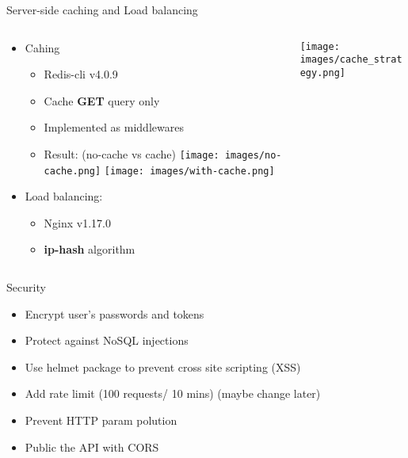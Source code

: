 \documentclass{beamer}
\begin{document}
\begin{frame}[fragile]{Server-side caching and Load balancing}
\begin{columns}
    \hspace{-2cm}
     \begin{column}{6cm}
        \linespread{1.3}
        \begin{itemize}
             \item Cahing
            \begin{itemize}
                \item Redis-cli v4.0.9
                \item Cache \textbf{GET} query only
                \item Implemented as middlewares
                \item Result: (no-cache vs cache)
                \texttt{[image: images/no-cache.png]}
                \texttt{[image: images/with-cache.png]}
            \end{itemize}
            \item Load balancing:
            \begin{itemize}
                \item Nginx v1.17.0
                \item \textbf{ip-hash} algorithm
            \end{itemize}
        \end{itemize}  
    \end{column}
    \hspace{-1.5cm}
    \begin{column}{4cm}
        \texttt{[image: images/cache\_strategy.png]}
    \end{column}
    \end{columns}

\end{frame}

\begin{frame}[fragile]{Security}
\begin{itemize}
	\item	Encrypt user's passwords and tokens
	\item	Protect against NoSQL injections
	\item	Use helmet package to prevent cross site scripting (XSS)
	\item	Add rate limit (100 requests/ 10 mins) (maybe change later)
	\item	Prevent HTTP param polution
	\item	Public the API with CORS
	\end{itemize}
\end{frame}
\end{document}
